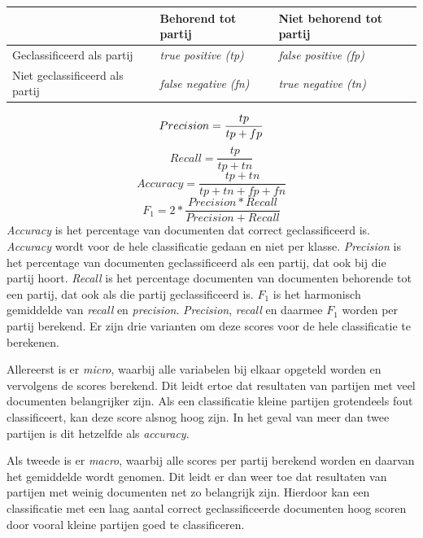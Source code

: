 \begin{table}[H]
\label{tab:scores}
\centering
\begin{tabular}{l|l|l}
 & Behorend tot partij & Niet behorend tot partij\\ \hline
Geclassificeerd als partij &   \textit{true positive (tp)} & \textit{false positive (fp)} \\ \hline
Niet geclassificeerd als partij & \textit{false negative (fn)} & \textit{true negative (tn)} \\
\end{tabular}
\end{table}
\begin{equation}
    Precision = \frac{tp}{tp + fp}\\
\end{equation}
\begin{equation}
    Recall = \frac{tp}{tp + tn}
\end{equation}
\begin{equation}
    Accuracy = \frac{tp + tn}{tp + tn + fp + fn}
\end{equation}
\begin{equation}
    F_1 = 2 * \frac{Precision * Recall}{Precision + Recall}
\end{equation}
\textit{Accuracy} is het percentage van documenten dat correct geclassificeerd is. \textit{Accuracy} wordt voor de hele classificatie gedaan en niet per klasse. \textit{Precision} is het percentage van documenten geclassificeerd als een partij, dat ook bij die partij hoort. \textit{Recall} is het percentage documenten van documenten behorende tot een partij, dat ook als die partij geclassificeerd is. $F_1$ is het harmonisch gemiddelde van \textit{recall} en \textit{precision}. \textit{Precision}, \textit{recall} en daarmee $F_1$ worden per partij berekend. Er zijn drie varianten om deze scores voor de hele classificatie te berekenen. \par
Allereerst is er \textit{micro}, waarbij alle variabelen bij elkaar opgeteld worden en vervolgens de scores berekend. Dit leidt ertoe dat resultaten van partijen met veel documenten belangrijker zijn. Als een classificatie kleine partijen grotendeels fout classificeert, kan deze score alsnog hoog zijn. In het geval van meer dan twee partijen is dit hetzelfde als \textit{accuracy}.\par 
Als tweede is er \textit{macro}, waarbij alle scores per partij berekend worden en daarvan het gemiddelde wordt genomen. Dit leidt er dan weer toe dat resultaten van partijen met weinig documenten net zo belangrijk zijn. Hierdoor kan een classificatie met een laag aantal correct geclassificeerde documenten hoog scoren door vooral kleine partijen goed te classificeren.\par
